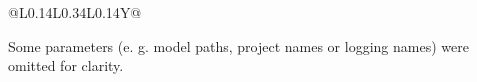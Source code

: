 \documentclass[10pt,twocolumn,letterpaper]{article}
\begin{document}
\begin{table}[t]
\begin{threeparttable}
\begin{tabularx}{\textwidth}{@{}L{0.14\textwidth}L{0.34\textwidth}L{0.14\textwidth}Y@{}}
\bottomrule
\end{tabularx}
\begin{tablenotes}
\footnotesize
\item Some parameters (e. g. model paths, project names or logging names) were omitted for clarity.
\end{tablenotes}
\end{threeparttable}
\end{table}
\end{document}
